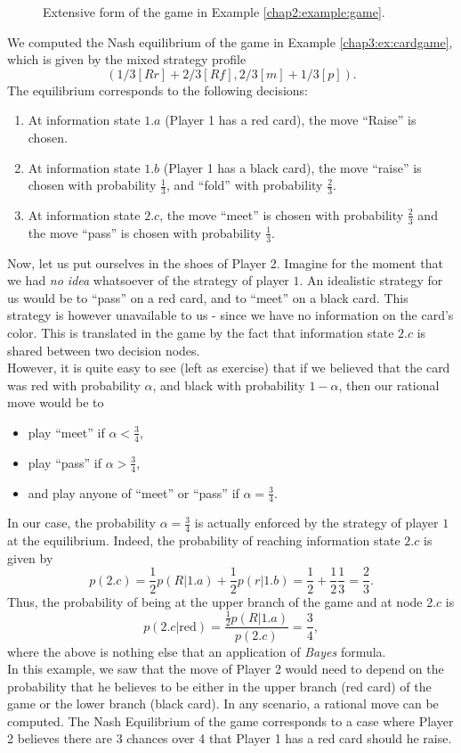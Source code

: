 \begin{example}
\begin{figure}[!ht]
\caption{Extensive form of the game in Example \ref{chap2:example:game}.}
\label{chap4:example:figtree}
\end{figure}
 We computed the Nash equilibrium of the game in Example \ref{chap3:ex:cardgame}, which is given by the mixed strategy profile
$$(1/3[Rr] + 2/3[Rf], 2/3[m] + 1/3[p]).$$
The equilibrium corresponds to the following decisions:
\begin{enumerate}
\item At information state $1.a$ (Player 1 has a red card), the move ``Raise'' is chosen.
\item At information state $1.b$ (Player 1 has a black card), the move ``raise'' is chosen with probability $\frac{1}{3}$, and ``fold'' with probability $\frac{2}{3}$.
\item At information state $2.c$, the move ``meet'' is chosen with probability $\frac{2}{3}$ and the move ``pass'' is chosen with probability $\frac{1}{3}$.
\end{enumerate}
Now, let us put ourselves in the shoes of Player 2. Imagine for the moment that we had \emph{no idea} whatsoever of the strategy of player $1$.  An idealistic strategy for us would be to ``pass'' on a red card, and to ``meet'' on a black card. This strategy is however unavailable to us - since we have no information on the card's color. This is translated in the game by the fact that information state $2.c$ is shared between two decision nodes.\\
However, it is quite easy to see (left as exercise) that  if we believed that the card was red with probability $\alpha$, and black with probability $1-\alpha$, then our rational move would be to
\begin{itemize}
\item play ``meet'' if $\alpha < \frac{3}{4}$,
\item play ``pass'' if $\alpha > \frac{3}{4}$,
\item and play anyone of ``meet'' or ``pass'' if $\alpha = \frac{3}{4}$.
\end{itemize}
In our case, the probability $\alpha = \frac{3}{4}$ is actually enforced by the strategy of player $1$ at the equilibrium.
Indeed, the probability of reaching information state $2.c$ is given by
$$ p(2.c) = \frac{1}{2}p(R | 1.a) + \frac{1}{2} p(r |  1.b) = \frac{1}{2} + \frac{1}{2} \frac{1}{3} = \frac{2}{3}. $$
Thus, the probability of being at the upper branch of the game and at node $2.c$ is
$$ p(2.c |  \text{red}) = \frac{\frac{1}{2}p(R | 1.a)}{p(2.c)} = \frac{3}{4},$$
where the above is nothing else that an application of \emph{Bayes} formula.\\

In this example, we saw that the move of Player 2 would need to depend on the probability that he believes to be either in the upper branch (red card) of the game or the lower branch (black card). In any scenario, a rational move can be computed. The Nash Equilibrium of the game corresponds to a case where Player 2 believes there are 3 chances over 4 that Player 1 has a red card should he raise.


\end{example}

